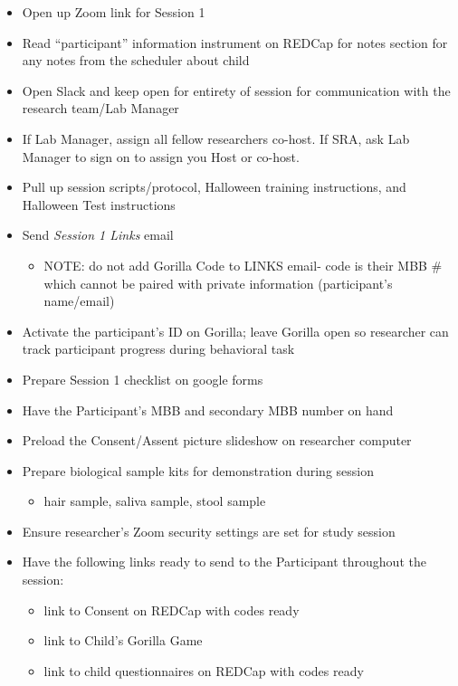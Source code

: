 \documentclass[]{book}
\providecommand{\tightlist}{%
  \setlength{\itemsep}{0pt}\setlength{\parskip}{0pt}}
\begin{document}
\begin{itemize}
\tightlist
\item
  Open up Zoom link for Session 1
\item
  Read ``participant'' information instrument on REDCap for notes section for any notes from the scheduler about child
\item
  Open Slack and keep open for entirety of session for communication with the research team/Lab Manager
\item
  If Lab Manager, assign all fellow researchers co-host. If SRA, ask Lab Manager to sign on to assign you Host or co-host.
\item
  Pull up session scripts/protocol, Halloween training instructions, and Halloween Test instructions
\item
  Send \emph{Session 1 Links} email

  \begin{itemize}
  \tightlist
  \item
    NOTE: do not add Gorilla Code to LINKS email- code is their MBB \# which cannot be paired with private information (participant's name/email)
  \end{itemize}
\item
  Activate the participant's ID on Gorilla; leave Gorilla open so researcher can track participant progress during behavioral task
\item
  Prepare Session 1 checklist on google forms
\item
  Have the Participant's MBB and secondary MBB number on hand
\item
  Preload the Consent/Assent picture slideshow on researcher computer
\item
  Prepare biological sample kits for demonstration during session

  \begin{itemize}
  \tightlist
  \item
    hair sample, saliva sample, stool sample
  \end{itemize}
\item
  Ensure researcher's Zoom security settings are set for study session
\item
  Have the following links ready to send to the Participant throughout the session:

  \begin{itemize}
  \tightlist
  \item
    link to Consent on REDCap with codes ready
  \item
    link to Child's Gorilla Game
  \item
    link to child questionnaires on REDCap with codes ready
  \end{itemize}
\end{itemize}
\end{document}
